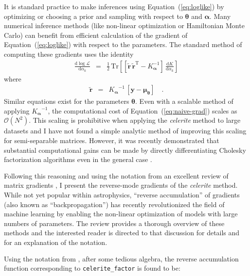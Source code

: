 \documentclass[rnaas]{aastex62}
\renewcommand{\eqref}[1]{\ref{eq:#1}}
\newcommand{\Eq}[1]{Equation~(\eqref{#1})}
\newcommand{\eqlabel}[1]{\label{eq:#1}}
\newcommand{\T}{\ensuremath{\mathrm{T}}}
\newcommand{\dd}{\ensuremath{ \mathrm{d}}}
\newcommand{\bvec}[1]{{\ensuremath{\boldsymbol{#1}}}}
\begin{document}
It is standard practice to make inferences using \Eq{loglike} by optimizing or
choosing a prior and sampling with respect to $\bvec{\theta}$ and
$\bvec{\alpha}$.
Many numerical inference methods (like non-linear optimization or Hamiltonian
Monte Carlo) can benefit from efficient calculation of the gradient of
\Eq{loglike} with respect to the parameters.
The standard method of computing these gradients uses the identity
\citep{Rasmussen:2006}
\begin{eqnarray}\eqlabel{naive-grad}
\frac{\dd \log \mathcal{L}}{\dd \alpha_k} &=&
    \frac{1}{2}\,\mathrm{Tr}\left[
        \left[
        \bvec{\tilde{r}}\,\bvec{\tilde{r}}^\T - {K_\bvec{\alpha}^{-1}}
        \right]
        \,\frac{\dd K}{\dd \alpha_k}
    \right]
\end{eqnarray}
where
\begin{eqnarray}
    \bvec{\tilde{r}} &=&
        {K_\bvec{\alpha}}^{-1}\,\left[\bvec{y}-\bvec{\mu}_\bvec{\theta}\right]
    \quad.
\end{eqnarray}
Similar equations exist for the parameters $\bvec{\theta}$.
Even with a scalable method of applying ${K_\bvec{\alpha}}^{-1}$, the
computational cost of \Eq{naive-grad} scales as $\mathcal{O}(N^2)$.
This scaling is prohibitive when applying the \emph{celerite} method to large
datasets and I have not found a simple analytic method of improving this
scaling for semi-separable matrices.
However, it was recently demonstrated that substantial computational gains can
be made by directly differentiating Cholesky factorization algorithms even in
the general case \citep{Murray:2016}.

Following this reasoning and using the notation from an excellent review of
matrix gradients \citep{Giles:2008}, I present the reverse-mode gradients of
the \emph{celerite} method.
While not yet popular within astrophysics, ``reverse accumulation'' of
gradients (also known as ``backpropagation'') has recently revolutionized the
field of machine learning \citep[see][for example]{LeCun:2015} by enabling the
non-linear optimization of models with large numbers of parameters.
The review \citep{Giles:2008} provides a thorough overview of these methods
and the interested reader is directed to that discussion for details and for
an explanation of the notation.

Using the notation from \citet{Giles:2008}, after some tedious
algebra, the reverse accumulation function corresponding to
\texttt{celerite\_factor} is found to be:
\end{document}
